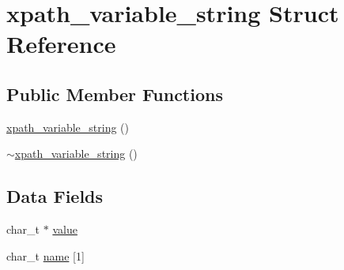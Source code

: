 \hypertarget{structxpath__variable__string}{
\section{xpath\_\-variable\_\-string Struct Reference}
\label{structxpath__variable__string}
}
\subsection*{Public Member Functions}
\begin{DoxyCompactItemize}
\item 
\hyperlink{structxpath__variable__string_a119d348b7f76371928faa5f5f80df815}{xpath\_\-variable\_\-string} ()
\item 
\hyperlink{structxpath__variable__string_a8e5e421f2e963e6196d2812a623ee912}{$\sim$xpath\_\-variable\_\-string} ()
\end{DoxyCompactItemize}
\subsection*{Data Fields}
\begin{DoxyCompactItemize}
\item 
char\_\-t $\ast$ \hyperlink{structxpath__variable__string_aeb8a87a8457d2615cd7b766fd3f30559}{value}
\item 
char\_\-t \hyperlink{structxpath__variable__string_a5c43cdcc55a620db0e7bdd29b4d56e89}{name} \mbox{[}1\mbox{]}
\end{DoxyCompactItemize}


